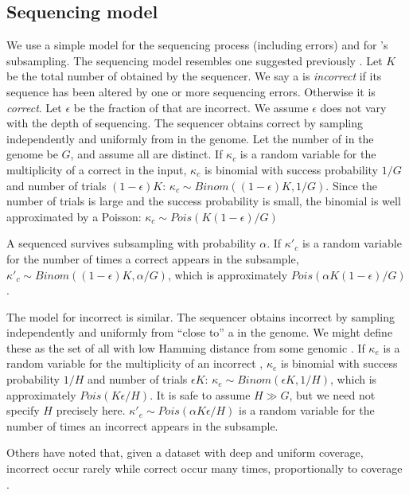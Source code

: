 \documentclass[10pt]{article}
\begin{document}
\subsection*{Sequencing model}
We use a simple model for the sequencing process (including errors) and for \tool's subsampling.  The sequencing model resembles one suggested previously \cite{melsted2014kmerstream}.  Let $K$ be the total number of \kmers obtained by the sequencer.  We say a \kmer is \emph{incorrect} if its sequence has been altered by one or more sequencing errors.  Otherwise it is \emph{correct}.  Let $\epsilon$ be the fraction of \kmers that are incorrect.  We assume $\epsilon$ does not vary with the depth of sequencing.  The sequencer obtains correct \kmers by sampling independently and uniformly from \kmers in the genome.  Let the number of \kmers in the genome be $G$, and assume all are distinct.  If $\kappa_c$ is a random variable for the multiplicity of a correct \kmer in the input, $\kappa_c$ is binomial with success probability $1/G$ and number of trials $(1-\epsilon)K$: $\kappa_c \sim Binom((1-\epsilon)K, 1/G)$.  Since the number of trials is large and the success probability is small, the binomial is well approximated by a Poisson: $\kappa_c \sim Pois(K(1-\epsilon)/G)$

A sequenced \kmer survives subsampling with probability $\alpha$.  If $\kappa'_c$ is a random variable for the number of times a correct \kmer appears in the subsample, $\kappa'_c \sim Binom((1-\epsilon)K, \alpha/G)$, which is approximately $Pois(\alpha K (1-\epsilon)/G)$.

The model for incorrect \kmers is similar.  The sequencer obtains incorrect \kmers by sampling independently and uniformly from \kmers ``close to'' a \kmer in the genome.  We might define these as the set of all \kmers with low Hamming distance from some genomic \kmer.  If $\kappa_e$ is a random variable for the multiplicity of an incorrect \kmer, $\kappa_e$ is binomial with success probability $1/H$ and number of trials $\epsilon K$: $\kappa_e \sim Binom(\epsilon K, 1/H)$, which is approximately $Pois(K \epsilon / H)$.  It is safe to assume $H \gg G$, but we need not specify $H$ precisely here.  $\kappa'_e \sim Pois(\alpha K \epsilon / H)$ is a random variable for the number of times an incorrect \kmer appears in the subsample.

Others have noted that, given a dataset with deep and uniform coverage, incorrect \kmers occur rarely while correct \kmers occur many times, proportionally to coverage \cite{pevzner2001eulerian, chaisson2004fragment}.
\end{document}
